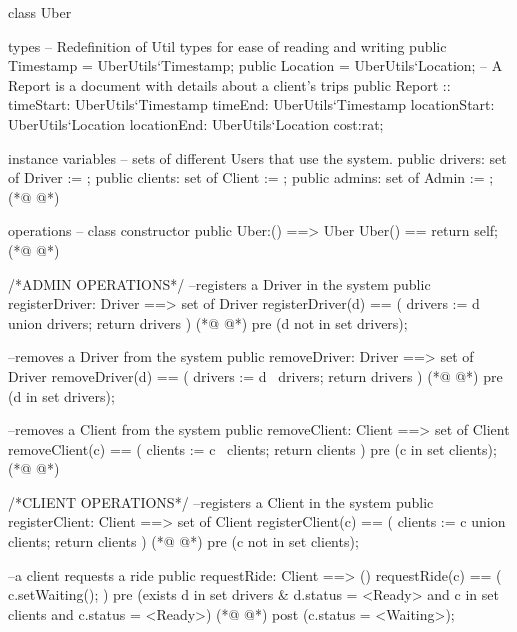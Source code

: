 \begin{vdmpp}[breaklines=true]
class Uber

types
    -- Redefinition of Util types for ease of reading and writing
    public Timestamp = UberUtils`Timestamp;
    public Location = UberUtils`Location;
    -- A Report is a document with details about a client's trips
    public Report :: timeStart: UberUtils`Timestamp
                     timeEnd: UberUtils`Timestamp
                     locationStart: UberUtils`Location
                     locationEnd: UberUtils`Location
                     cost:rat;

instance variables
    -- sets of different Users that use the system.
    public drivers: set of Driver := {};
    public clients: set of Client := {};
    public admins: set of Admin := {};
(*@
\label{Uber:19}
@*)

operations
    -- class constructor
    public Uber:() ==> Uber
        Uber() ==
        return self;
(*@
\label{registerDriver:25}
@*)

    /*ADMIN OPERATIONS*/
    --registers a Driver in the system
    public registerDriver: Driver ==> set of Driver
        registerDriver(d) == (
            drivers := {d} union drivers;
            return drivers
        )    
(*@
\label{removeDriver:33}
@*)
        pre (d not in set drivers);
    
    --removes a Driver from the system
    public removeDriver: Driver ==> set of Driver
        removeDriver(d) == (
            drivers := {d} \ drivers;
            return drivers
        )    
(*@
\label{removeClient:41}
@*)
        pre (d in set drivers);

    --removes a Client from the system
    public removeClient: Client ==> set of Client
        removeClient(c) == (
            clients := {c} \ clients;
            return clients
        )    
        pre (c in set clients);
(*@
\label{registerClient:50}
@*)
    
    /*CLIENT OPERATIONS*/
    --registers a Client in the system
    public registerClient: Client ==> set of Client
        registerClient(c) == (
            clients := {c} union clients;
            return clients
        )    
(*@
\label{requestRide:58}
@*)
        pre (c not in set clients);
    
    --a client requests a ride    
    public requestRide: Client ==> ()
        requestRide(c) == (
            c.setWaiting();
        )
        pre (exists d in set drivers & d.status = <Ready> and c in set clients and c.status = <Ready>)
(*@
\label{goOnRide:66}
@*)
        post (c.status = <Waiting>);
        

\end{vdmpp}
